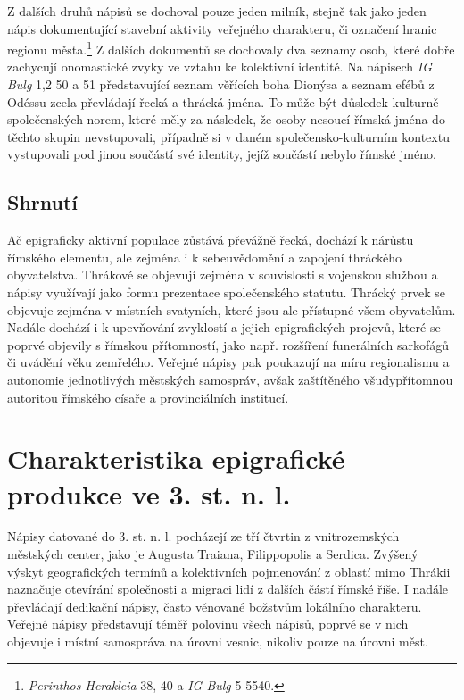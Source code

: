 Z dalších druhů nápisů se dochoval pouze jeden milník, stejně tak jako jeden nápis dokumentující stavební aktivity veřejného charakteru, či označení hranic regionu města.\footnote{{\em Perinthos-Herakleia} 38, 40 a {\em IG Bulg} 5 5540.} Z dalších dokumentů se dochovaly dva seznamy osob, které dobře zachycují onomastické zvyky ve vztahu ke kolektivní identitě. Na nápisech {\em IG Bulg} 1,2 50 a 51 představující seznam věřících boha Dionýsa a seznam efébů z Odéssu zcela převládají řecká a thrácká jména. To může být důsledek kulturně-společenských norem, které měly za následek, že osoby nesoucí římská jména do těchto skupin nevstupovali, případně si v daném společensko-kulturním kontextu vystupovali pod jinou součástí své identity, jejíž součástí nebylo římské jméno.

\subsection[shrnutí-18]{Shrnutí}

Ač epigraficky aktivní populace zůstává převážně řecká, dochází k nárůstu římského elementu, ale zejména i k sebeuvědomění a zapojení thráckého obyvatelstva. Thrákové se objevují zejména v souvislosti s vojenskou službou a nápisy využívají jako formu prezentace společenského statutu. Thrácký prvek se objevuje zejména v místních svatyních, které jsou ale přístupné všem obyvatelům. Nadále dochází i k upevňování zvyklostí a jejich epigrafických projevů, které se poprvé objevily s římskou přítomností, jako např. rozšíření funerálních sarkofágů či uvádění věku zemřelého. Veřejné nápisy pak poukazují na míru regionalismu a autonomie jednotlivých městských samospráv, avšak zaštítěného všudypřítomnou autoritou římského císaře a provinciálních institucí.

\section[charakteristika-epigrafické-produkce-ve-3.-st.-n.-l.]{Charakteristika epigrafické produkce ve 3. st. n. l.}

Nápisy datované do 3. st. n. l. pocházejí ze tří čtvrtin z vnitrozemských městských center, jako je Augusta Traiana, Filippopolis a Serdica. Zvýšený výskyt geografických termínů a kolektivních pojmenování z oblastí mimo Thrákii naznačuje otevírání společnosti a migraci lidí z dalších částí římské říše. I nadále převládají dedikační nápisy, často věnované božstvům lokálního charakteru. Veřejné nápisy představují téměř polovinu všech nápisů, poprvé se v nich objevuje i místní samospráva na úrovni vesnic, nikoliv pouze na úrovni měst.


